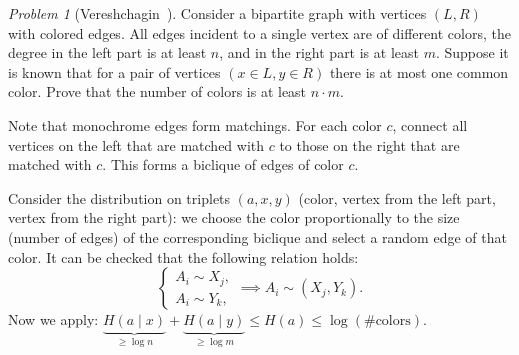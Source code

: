 \documentclass[12pt,sans]{article}
\theoremstyle{definition}
\theoremstyle{plain}
\theoremstyle{remark}
\newtheorem{problem}{Problem}[section]
\begin{document}
\begin{problem}[Vereshchagin~\cite{KRV18}]
    Consider a bipartite graph with vertices \((L, R)\) with colored edges.
    All edges incident to a single vertex are of different colors, the degree in the left part is at least \(n\),
    and in the right part is at least \(m\). Suppose it is known that for a pair of vertices \((x \in L, y \in R)\)
    there is at most one common color. Prove that the number of colors is at least \(n \cdot m\).

    Note that monochrome edges form matchings. For each color \(c\), connect all
    vertices on the left that are matched with \(c\) to those on the right that are matched with \(c\). This forms a biclique of
    edges of color \(c\).

    Consider the distribution on triplets \((a, x, y)\) (color, vertex from the left part, vertex from the right
    part): we choose the color proportionally to the size (number of edges) of the corresponding biclique and
    select a random edge of that color. It can be checked that the following relation holds:
\[
    \begin{cases}
        A_i \sim X_j,\\
        A_i \sim Y_k,
    \end{cases} \implies A_i \sim (X_j, Y_k).
\]
Now we apply: \(\underbrace{H(a \mid x)}_{\ge \log n} +
                  \underbrace{H(a \mid y)}_{\ge \log m} \le H(a) \le \log (\text{\# colors})\).
\end{problem}
\end{document}
